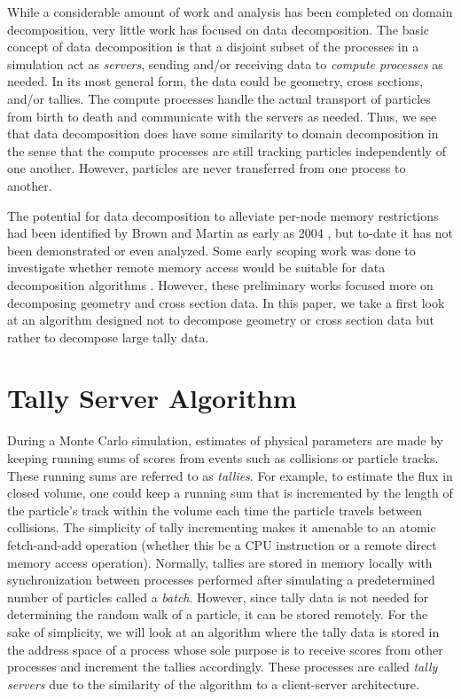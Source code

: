 \documentclass[3p]{elsarticle}
\begin{document}
While a considerable amount of work and analysis has been completed on domain
decomposition, very little work has focused on data decomposition. The basic
concept of data decomposition is that a disjoint subset of the processes in a
simulation act as {\em servers}, sending and/or receiving data to {\em compute
  processes} as needed. In its most general form, the data could be geometry,
cross sections, and/or tallies. The compute processes handle the actual
transport of particles from birth to death and communicate with the servers as
needed. Thus, we see that data decomposition does have some similarity to domain
decomposition in the sense that the compute processes are still tracking
particles independently of one another. However, particles are never transferred
from one process to another.

The potential for data decomposition to alleviate per-node memory restrictions
had been identified by Brown and Martin as early as 2004
\cite{trans-brown-2004}, but to-date it has not been demonstrated or even
analyzed. Some early scoping work was done to investigate whether remote memory
access would be suitable for data decomposition algorithms
\cite{pnst-romano-2011}. However, these preliminary works focused more on
decomposing geometry and cross section data. In this paper, we take a first look
at an algorithm designed not to decompose geometry or cross section data but
rather to decompose large tally data.

\section{Tally Server Algorithm}
\label{sec:algorithm}

During a Monte Carlo simulation, estimates of physical parameters are made by
keeping running sums of scores from events such as collisions or particle
tracks. These running sums are referred to as {\em tallies}. For example, to
estimate the flux in closed volume, one could keep a running sum that is
incremented by the length of the particle's track within the volume each time
the particle travels between collisions. The simplicity of tally incrementing
makes it amenable to an atomic fetch-and-add operation (whether this be a CPU
instruction or a remote direct memory access operation). Normally, tallies are
stored in memory locally with synchronization between processes performed after
simulating a predetermined number of particles called a {\em batch}. However,
since tally data is not needed for determining the random walk of a particle, it
can be stored remotely. For the sake of simplicity, we will look at an algorithm
where the tally data is stored in the address space of a process whose sole
purpose is to receive scores from other processes and increment the tallies
accordingly. These processes are called {\em tally servers} due to the
similarity of the algorithm to a client-server architecture.
\end{document}
